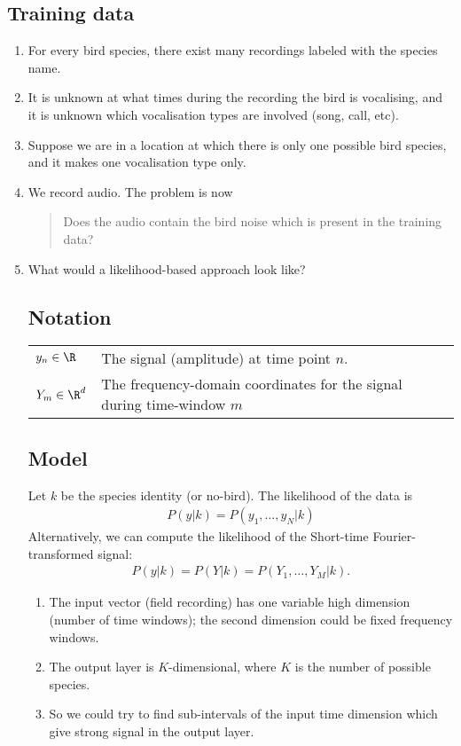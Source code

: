 \documentclass{article}
\begin{document}
\begin{enumerate}
\section*{Training data}
\begin{enumerate}
\item For every bird species, there exist many recordings labeled with the species name.
\item It is unknown at what times during the recording the bird is vocalising, and it is unknown which vocalisation
  types are involved (song, call, etc).
\item Suppose we are in a location at which there is only one possible bird species, and it makes one vocalisation type only.
\item We record audio. The problem is now
  \begin{quote}
    Does the audio contain the bird noise which is present in the training data?
  \end{quote}
\item What would a likelihood-based approach look like?

\section*{Notation }
\begin{tabular}{l|l}
  $y_n \in \R$                   & The signal (amplitude) at time point $n$. \\
  $Y_m \in \R^d$                 & The frequency-domain coordinates for the signal during time-window $m$
\end{tabular}


\section{Model}

Let $k$ be the species identity (or no-bird). The likelihood of the data is
\begin{align*}
  P(y|k) = P(y_1, \ldots, y_N | k)
\end{align*}
Alternatively, we can compute the likelihood of the Short-time Fourier-transformed signal:
\begin{align*}
  P(y|k) = P(Y|k) = P(Y_1, \ldots, Y_M|k).
\end{align*}

\begin{enumerate}
\item The input vector (field recording) has one variable high dimension (number of time windows); the second
  dimension could be fixed frequency windows.
\item The output layer is $K$-dimensional, where $K$ is the number of possible species.
\item So we could try to find sub-intervals of the input time dimension which give strong signal in the output layer.
\end{enumerate}



\end{enumerate}
\end{enumerate}
\end{document}

